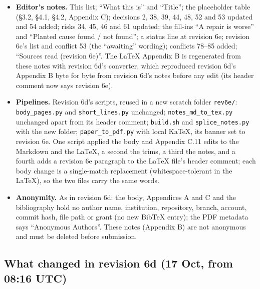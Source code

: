 \documentclass{article}
\theoremstyle{plain}
\theoremstyle{definition}
\theoremstyle{remark}
\begin{document}
\begin{itemize}
{        lead).} LW-10's factual description of the plant and its ``finds a known
        cause'' rule (decision 54).
  \item \textbf{Editor's notes.} This list; ``What this is'' and ``Title''; the
        placeholder table (\S{}3.2, \S{}4.1, \S{}4.2, Appendix C); decisions 2,
        38, 39, 44, 48, 52 and 53 updated and 54 added; risks 34, 45, 46 and 61
        updated; the fill-ins ``A repair is worse'' and ``Planted cause found /
        not found''; a status line at revision 6e; revision 6c's list and
        conflict 53 (the ``awaiting'' wording); conflicts 78--85 added;
        ``Sources read (revision 6e)''. The LaTeX Appendix B is regenerated from
        these notes with revision 6d's converter, which reproduced revision 6d's
        Appendix B byte for byte from revision 6d's notes before any edit (its
        header comment now says revision 6e).
  \item \textbf{Pipelines.} Revision 6d's scripts, reused in a new scratch
        folder \nolinkurl{rev6e/}: \nolinkurl{body_pages.py} and
        \nolinkurl{short_lines.py} unchanged; \nolinkurl{notes_md_to_tex.py}
        unchanged apart from its header comment; \nolinkurl{build.sh} and
        \nolinkurl{splice_notes.py} with the new folder;
        \nolinkurl{paper_to_pdf.py} with local KaTeX, its banner set to revision
        6e. One script applied the body and Appendix C.11 edits to the Markdown
        and the LaTeX, a second the trims, a third the notes, and a fourth adds
        a revision 6e paragraph to the LaTeX file's header comment; each body
        change is a single-match replacement (whitespace-tolerant in the LaTeX),
        so the two files carry the same words.
  \item \textbf{Anonymity.} As in revision 6d: the body, Appendices A and C and
        the bibliography hold no author name, institution, repository, branch,
        account, commit hash, file path or grant (no new BibTeX entry); the PDF
        metadata says ``Anonymous Authors''. These notes (Appendix B) are not
        anonymous and must be deleted before submission.
\end{itemize}

\subsection{What changed in revision 6d (17 Oct, from 08:16 UTC)}
\end{document}
